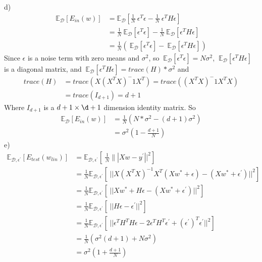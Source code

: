 \documentclass[12pt]{article}
\begin{document}
d) \begin{align*} \displaystyle\mathbb{E}_\mathcal{D}[E_{in}( {w})] &= \mathbb{E}_\mathcal{D}\left[\frac{1}{N}\  {\epsilon}^T {\epsilon} -\frac{1}{N}\  {\epsilon}^T {H} {\epsilon}\right]\\
&= \frac{1}{N}\ \mathbb{E}_\mathcal{D}\left[ {\epsilon}^T {\epsilon}\right] -\frac{1}{N}\ \mathbb{E}_\mathcal{D}\left[ {\epsilon}^T {H} {\epsilon}\right] \\
&= \frac{1}{N}(\ \mathbb{E}_\mathcal{D}\left[ {\epsilon}^T {\epsilon}\right] -\ \mathbb{E}_\mathcal{D}\left[ {\epsilon}^T {H} {\epsilon}\right] )
\end{align*}
Since $\epsilon$ is a noise term with zero means and $\sigma^2$, so $\ \mathbb{E}_\mathcal{D}\left[ {\epsilon}^T {\epsilon}\right] = N\sigma^2$, $\ \mathbb{E}_\mathcal{D}\left[ {\epsilon}^TH {\epsilon}\right]$ is a diagonal matrix, and $\ \mathbb{E}_\mathcal{D}\left[ {\epsilon}^T H {\epsilon}\right] =  trace(H)*\sigma^2$ and \begin{align*}
trace(H) &= trace(X(X^TX)^-1X^T) = trace((X^TX)^-1X^TX) \\ &=trace(I_{d+1}) = d+1
\end{align*} Where $I_{d+1}$ is a $d+1 \times \d+1$ dimension identity matrix. So 
\begin{align*} 
 \displaystyle\mathbb{E}_\mathcal{D}[E_{in}( {w})] &= \frac{1}{N}(N*\sigma^2 - (d+1)\sigma^2) \\ &= \sigma^2(1 - \frac{d+1}{N}) \end{align*}
e) \begin{align*}
\mathbb{E}_{\mathcal{D},   {\epsilon}^\prime}[E_{test}(  {w}_{lin})] 
			&= \mathbb{E}_{\mathcal{D},   {\epsilon}^\prime}\left[\ \frac{1}{N}\||Xw - y^\prime||^2 \right] \\
			&= \frac{1}{N}\mathbb{E}_{\mathcal{D},   {\epsilon}^\prime}\left[\ ||X(X^TX)^{-1}X^T(Xw^*+\epsilon) -(Xw^*+\epsilon^\prime)||^2 \right]\\
			&=\frac{1}{N}\mathbb{E}_{\mathcal{D}, {\epsilon}^\prime}\left[\ ||Xw^* + H\epsilon - (Xw^*+\epsilon^\prime) ||^2 \right]\\
			&=\frac{1}{N}\mathbb{E}_{\mathcal{D}, {\epsilon}^\prime}\left[\ ||H\epsilon - \epsilon^\prime ||^2 \right]\\
			&=\frac{1}{N}\mathbb{E}_{\mathcal{D}, {\epsilon}^\prime}\left[\ ||\epsilon^TH^TH\epsilon - 2\epsilon^TH^T\epsilon^\prime + (\epsilon^\prime)^T\epsilon^\prime||^2 \right]\\
			& = \frac{1}{N}(\sigma^2(d+1) + N\sigma^2)\\
			& = \sigma^2(1+\frac{d+1}{N})
\end{align*}\\
\end{document}
